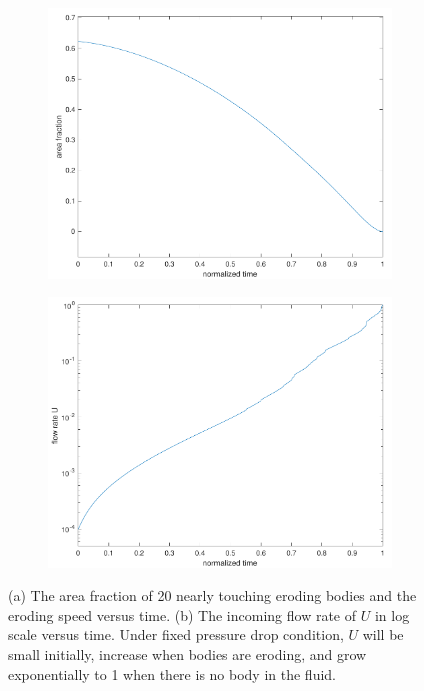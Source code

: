 \documentclass[preprint, 10pt]{elsarticle}
\begin{document}
\begin{figure}[H]
\begin{subfigure}[b]{0.5\textwidth}
\includegraphics*[width =\linewidth]{./figs/porosity20dense}
\caption{}
\end{subfigure}
\begin{subfigure}[b]{0.5\textwidth}
\includegraphics*[width =\linewidth]{./figs/flow_rate20dense}
\caption{}
\end{subfigure}
\caption{\label{fig:Eroding20flowrate}(a) The area fraction of 20 nearly
 touching eroding bodies and the eroding speed versus time. 
(b) The incoming flow rate of $U$ in log scale versus time. 
Under fixed pressure drop condition, $U$ will be small initially,
increase when bodies are eroding, and grow exponentially 
to 1 when there is no body in the fluid. }
\end{figure}
\end{document}
